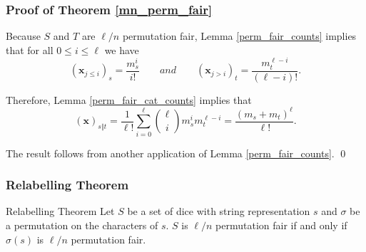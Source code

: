 \documentclass[aspectratio=169]{beamer}
\begin{document}
\begin{frame}[triangle=siiblue]
\frametitle{Proof of Theorem \ref{mn_perm_fair}}
Because $S$ and $T$ are $\ell/n$ permutation fair,  Lemma \ref{perm_fair_counts} implies that for all $0 \leq i \leq \ell$ we have
\begin{equation*}
	(\mathbf{x}_{j\leq i})_s = \frac{m_s^i}{i!}  \qquad and \qquad (\mathbf{x}_{j > i})_t = \frac{m_t^{\ell-i}}{(\ell-i)!}.
\end{equation*}

\vfill

Therefore,  Lemma \ref{perm_fair_cat_counts} implies that
\begin{equation*}
(\mathbf{x})_{s \Vert t} = \frac{1}{\ell!} \sum_{i=0}^\ell \binom{\ell}{i} m_s^i m_t^{\ell-i} = \frac{(m_s + m_t)^\ell}{\ell!}. 
\end{equation*}

The result follows from another application of Lemma \ref{perm_fair_counts}.  \qed
\end{frame}

\begin{frame}[triangle=siiblue]
\frametitle{Relabelling Theorem}
\begin{siitheorem}[label=relabelling]{Relabelling Theorem}{}
Let $S$ be a set of dice with string representation $s$ and $\sigma$ be a permutation on the characters of $s$.  $S$ is $\ell/n$ permutation fair if and only if $\sigma(s)$ is $\ell/n$ permutation fair.
\end{siitheorem}

\end{frame}
\end{document}

